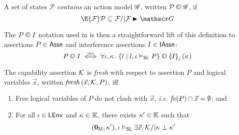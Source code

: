 \begin{definition}
A set of states $\mathcal P$ \emph{contains} an action model $\mathscr{G}$, written $\mathcal P \containI \gmod$, if
%
\[
  \E{\fence{}} \mathcal P\subseteq \fence{} /| \fence{} \strictfences \gmod
\]
\end{definition}
%
The $P\containI I$ notation used in \extendRule is then a straightforward lift of this definition to assertions $P \in \textsf{Assn}$ and interference assertions $I \in \textsf{IAssn}$:
%
\[
	P \containI I \iffdef \for{\lenv, \ca{}} \left\{l \mid l, \lenv \slsat P \right\} \containI \semI[\lenv]{I}(\ca{})
\]
%
\begin{definition}[Freshness]
The capability assertion $\mathcal{K}_{}$ is \emph{fresh} with respect to assertion $P$ and logical variables $\vec{x}$, written $\mathit{fresh}\left(\vec{x}, \mathcal{K}_{}, P\right)$, iff 
%
\begin{enumerate}
	\item Free logical variables of $P$ do not clash with $\vec{x}$, \textit{i.e.} $\mathit{fv}(P) \cap \vec{x} = \emptyset$; and
	\item For all $\iota \in \textsf{LEnv}$ and $\kappa_{} \in \mathbb{K}$, there exists $\kappa_{}' \in \mathbb{K}$ such that
	\[
		(\mathbf{0}_{\mathbb{M}}, \kappa_{}'), \iota \mathrel{\vDash_{\mathsf{SL}}} \exists \vec{x}.\, \mathcal{K}_{} /|  \kappa_{} \mathrel{\bot} \kappa_{}'
	\]
\end{enumerate}
%
\end{definition}
%
%
